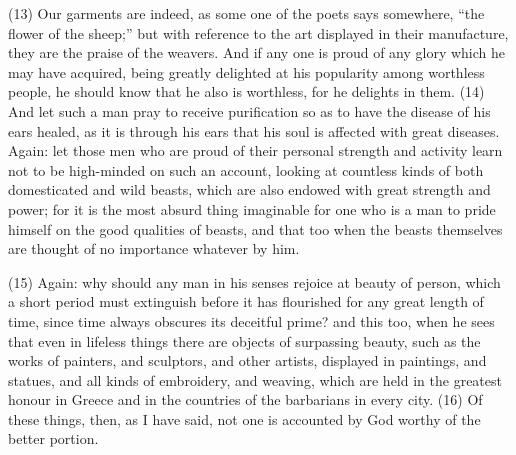 (13) Our garments are indeed, as some one of the poets says somewhere, ``the flower of the
sheep;'' but with reference to the art displayed in their manufacture, they are the praise of the
weavers. And if any one is proud of any glory which he may have acquired, being greatly delighted
at his popularity among worthless people, he should know that he also is worthless, for he delights
in them. (14) And let such a man pray to receive purification so as to have the disease of his ears
healed, as it is through his ears that his soul is affected with great diseases. Again: let those men
who are proud of their personal strength and activity learn not to be high-minded on such an
account, looking at countless kinds of both domesticated and wild beasts, which are also endowed
with great strength and power; for it is the most absurd thing imaginable for one who is a man to
pride himself on the good qualities of beasts, and that too when the beasts themselves are thought
of no importance whatever by him.

(15) Again: why should any man in his senses rejoice at beauty of person, which a short period
must extinguish before it has flourished for any great length of time, since time always obscures its
deceitful prime? and this too, when he sees that even in lifeless things there are objects of
surpassing beauty, such as the works of painters, and sculptors, and other artists, displayed in
paintings, and statues, and all kinds of embroidery, and weaving, which are held in the greatest
honour in Greece and in the countries of the barbarians in every city. (16) Of these things, then, as
I have said, not one is accounted by God worthy of the better portion.

